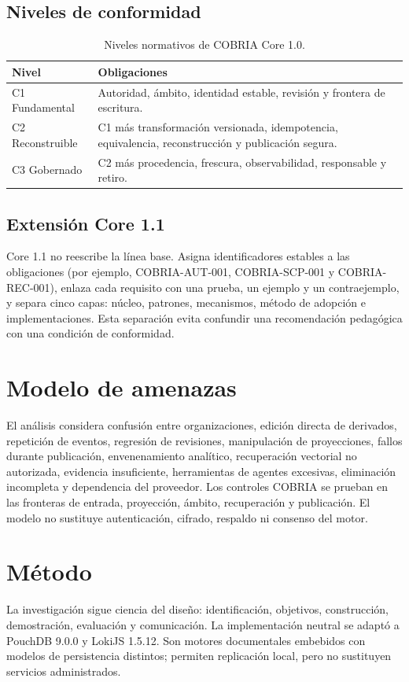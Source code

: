 \documentclass[11pt]{article}
\begin{document}
\subsection{Niveles de conformidad}
\begin{table}[h]
\centering
\caption{Niveles normativos de COBRIA Core 1.0.}
\begin{tabularx}{\textwidth}{lX}
\toprule Nivel & Obligaciones \\ \midrule
C1 Fundamental & Autoridad, ámbito, identidad estable, revisión y frontera de escritura.\\
C2 Reconstruible & C1 más transformación versionada, idempotencia, equivalencia, reconstrucción y publicación segura.\\
C3 Gobernado & C2 más procedencia, frescura, observabilidad, responsable y retiro.\\ \bottomrule
\end{tabularx}
\end{table}

\subsection{Extensión Core 1.1}
Core 1.1 no reescribe la línea base. Asigna identificadores estables a las obligaciones (por ejemplo, COBRIA-AUT-001, COBRIA-SCP-001 y COBRIA-REC-001), enlaza cada requisito con una prueba, un ejemplo y un contraejemplo, y separa cinco capas: núcleo, patrones, mecanismos, método de adopción e implementaciones. Esta separación evita confundir una recomendación pedagógica con una condición de conformidad.

\section{Modelo de amenazas}
El análisis considera confusión entre organizaciones, edición directa de derivados, repetición de eventos, regresión de revisiones, manipulación de proyecciones, fallos durante publicación, envenenamiento analítico, recuperación vectorial no autorizada, evidencia insuficiente, herramientas de agentes excesivas, eliminación incompleta y dependencia del proveedor. Los controles COBRIA se prueban en las fronteras de entrada, proyección, ámbito, recuperación y publicación. El modelo no sustituye autenticación, cifrado, respaldo ni consenso del motor.

\section{Método}
La investigación sigue ciencia del diseño: identificación, objetivos, construcción, demostración, evaluación y comunicación. La implementación neutral se adaptó a PouchDB 9.0.0 y LokiJS 1.5.12. Son motores documentales embebidos con modelos de persistencia distintos; permiten replicación local, pero no sustituyen servicios administrados.
\end{document}
